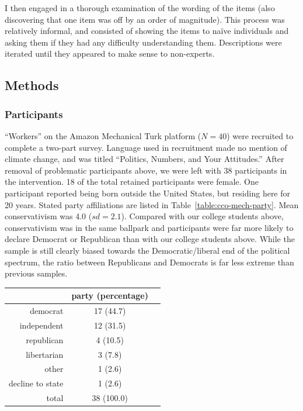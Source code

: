 I then engaged in a thorough examination of the wording of the items (also
discovering that one item was off by an order of magnitude). This process was
relatively informal, and consisted of showing the items to naïve individuals and
asking them if they had any difficulty understanding them. Descriptions were
iterated until they appeared to make sense to non-experts.

\subsection{Methods}

\subsubsection{Participants}
\label{sec:CCO-ndi-participants}

“Workers” on the Amazon Mechanical Turk platform ($N=40$) were recruited to
complete a two-part survey. Language used in recruitment made no mention of
climate change, and was titled “Politics, Numbers, and Your Attitudes.” After
removal of problematic participants above, we were left with 38 participants in
the intervention. 18 of the total retained participants were female. One
participant reported being born outside the United States, but residing here for
20 years. Stated party affiliations are listed in
Table~\ref{table:cco-mech-party}. Mean conservativism was 4.0 ($sd=2.1$).
Compared with our college students above, conservativism was in the same
ballpark and participants were far more likely to declare Democrat or Republican
than with our college students above. While the sample is still clearly biased
towards the Democratic/liberal end of the political spectrum, the ratio
between Republicans and Democrats is far less extreme than previous samples. 

\begin{table}[ht]
\centering
\begin{tabular}{rcc}
  \toprule
      & party (percentage) \\ 
  \midrule
  democrat &  17 (44.7) \\ 
  independent &  12 (31.5) \\ 
  republican &   4 (10.5) \\ 
  libertarian &   3 (7.8) \\ 
  other &   1 (2.6) \\ 
  decline to state &   1 (2.6) \\ 
  \midrule
  total &  38 (100.0) \\ 
   \bottomrule
\end{tabular}
\end{table}

